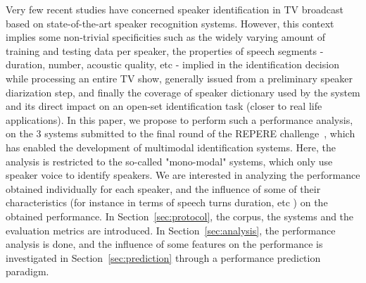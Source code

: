 Very few recent studies have concerned speaker identification in TV broadcast based on state-of-the-art speaker recognition systems. However, this context implies some non-trivial specificities such as the widely varying amount of training and testing data per speaker, the properties of speech segments - duration, number, acoustic quality, etc - implied in the identification decision while processing an entire TV show, generally issued from a preliminary speaker diarization step, and finally the coverage of speaker dictionary used by the system and its direct impact on an open-set identification task (closer to real life applications). In this paper, we propose to perform such a performance analysis, on the 3 systems submitted to the final round of the REPERE challenge~\cite{KAHN--CBMI--2012}, which has enabled the development of multimodal identification systems. Here, the analysis is restricted to the so-called "mono-modal" systems, which only use speaker voice to identify speakers. We are interested in analyzing the performance obtained individually for each speaker, and the influence of some of their characteristics (for instance in terms of speech turns duration, etc ) on the obtained performance. In Section~\ref{sec:protocol}, the corpus, the systems and the evaluation metrics are introduced. In Section~\ref{sec:analysis}, the performance analysis is done, and the influence of some features on the performance is investigated in Section~\ref{sec:prediction} through a performance prediction paradigm.